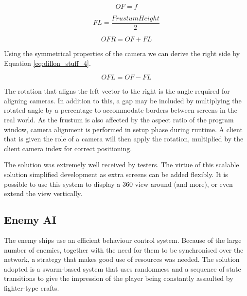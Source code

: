 \documentclass[a4paper,11pt]{article}
\begin{document}

\begin{equation}
	OF = f
	\label{eq:dillon_stuff_1}
\end{equation}

\begin{equation}
	FL =\frac{Frustum Height}{2}
    \label{eq:dillon_stuff_2}
\end{equation}

\begin{equation}
	OFR = OF + FL
    \label{eq:dillon_stuff_3}
\end{equation}

Using the symmetrical properties of the camera we can derive the right side by Equation \ref{eq:dillon_stuff_4}.

\begin{equation}
	OFL = OF - FL
	\label{eq:dillon_stuff_4}
\end{equation}

The rotation that aligns the left vector to the right is the angle required for aligning cameras. In addition to this, a gap may be included by multiplying the rotated angle by a percentage to accommodate borders between screens in the real world. As the frustum is also affected by the aspect ratio of the program window, camera alignment is performed in setup phase during runtime. A client that is given the role of a camera will then apply the rotation, multiplied by the client camera index for correct positioning.

The solution was extremely well received by testers. The virtue of this scalable solution simplified development as extra screens can be added flexibly. It is possible to use this system to display a 360 view around (and more), or even extend the view vertically.


\subsection{Enemy AI}
The enemy ships use an efficient behaviour control system. Because of the large number of enemies, together with the need for them to be synchronised over the network, a strategy that makes good use of resources was needed. The solution adopted is a swarm-based system that uses randomness and a sequence of state transitions to give the impression of the player being constantly assaulted by fighter-type crafts. 
\end{document}
